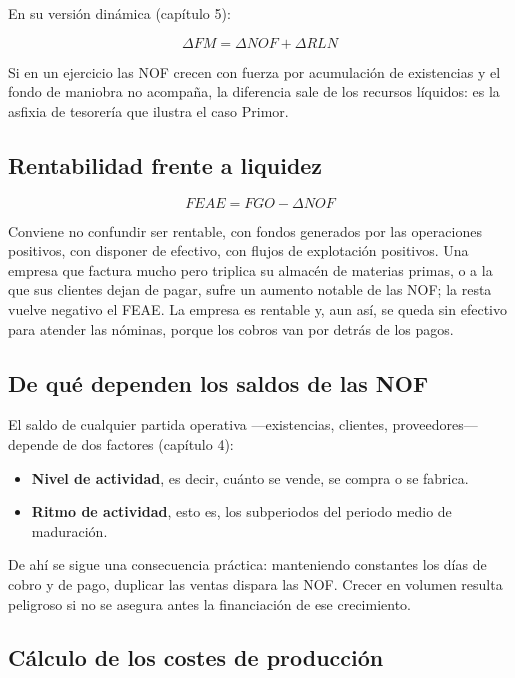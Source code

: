 \documentclass[12pt]{book} %
\providecommand{\tightlist}{%
  \setlength{\itemsep}{0pt}\setlength{\parskip}{0pt}}
\begin{document}
En su versión dinámica (capítulo 5):

\[\Delta FM = \Delta NOF + \Delta RLN\]

Si en un ejercicio las NOF crecen con fuerza por acumulación de
existencias y el fondo de maniobra no acompaña, la diferencia sale de
los recursos líquidos: es la asfixia de tesorería que ilustra el caso
Primor.

\hypertarget{rentabilidad-frente-a-liquidez}{%
\subsection{Rentabilidad frente a
liquidez}\label{rentabilidad-frente-a-liquidez}}

\[FEAE = FGO - \Delta NOF\]

Conviene no confundir ser rentable, con fondos generados por las
operaciones positivos, con disponer de efectivo, con flujos de
explotación positivos. Una empresa que factura mucho pero triplica su
almacén de materias primas, o a la que sus clientes dejan de pagar,
sufre un aumento notable de las NOF; la resta vuelve negativo el FEAE.
La empresa es rentable y, aun así, se queda sin efectivo para atender
las nóminas, porque los cobros van por detrás de los pagos.

\hypertarget{de-quuxe9-dependen-los-saldos-de-las-nof}{%
\subsection{De qué dependen los saldos de las
NOF}\label{de-quuxe9-dependen-los-saldos-de-las-nof}}

El saldo de cualquier partida operativa ---existencias, clientes,
proveedores--- depende de dos factores (capítulo 4):

\begin{itemize}
\tightlist
\item
  \textbf{Nivel de actividad}, es decir, cuánto se vende, se compra o se
  fabrica.
\item
  \textbf{Ritmo de actividad}, esto es, los subperiodos del periodo
  medio de maduración.
\end{itemize}

De ahí se sigue una consecuencia práctica: manteniendo constantes los
días de cobro y de pago, duplicar las ventas dispara las NOF. Crecer en
volumen resulta peligroso si no se asegura antes la financiación de ese
crecimiento.

\hypertarget{cuxe1lculo-de-los-costes-de-producciuxf3n}{%
\subsection{Cálculo de los costes de
producción}\label{cuxe1lculo-de-los-costes-de-producciuxf3n}}
\end{document}
